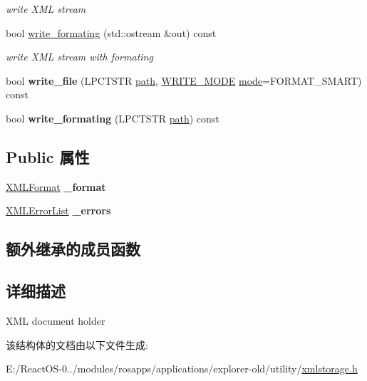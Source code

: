\begin{DoxyCompactItemize}
\begin{DoxyCompactList}\small\item\em write X\+ML stream \end{DoxyCompactList}\item 
\mbox{\label{struct_x_m_l_storage_1_1_x_m_l_doc_aeadd847c0b54fbc43ee477e83d246a5c}} 
bool \hyperlink{struct_x_m_l_storage_1_1_x_m_l_doc_aeadd847c0b54fbc43ee477e83d246a5c}{write\+\_\+formating} (std\+::ostream \&out) const
\begin{DoxyCompactList}\small\item\em write X\+ML stream with formating \end{DoxyCompactList}\item 
\mbox{\label{struct_x_m_l_storage_1_1_x_m_l_doc_a371cebadb2ee0377cf5f3123493a3147}} 
bool {\bfseries write\+\_\+file} (L\+P\+C\+T\+S\+TR \hyperlink{structpath}{path}, \hyperlink{xmlstorage_8h_a384e8ed47866fe059e3ad92b8d89d462}{W\+R\+I\+T\+E\+\_\+\+M\+O\+DE} \hyperlink{interfacevoid}{mode}=F\+O\+R\+M\+A\+T\+\_\+\+S\+M\+A\+RT) const
\item 
\mbox{\label{struct_x_m_l_storage_1_1_x_m_l_doc_ae4fb2de2549f3584ebcbf7a70b1d9fdd}} 
bool {\bfseries write\+\_\+formating} (L\+P\+C\+T\+S\+TR \hyperlink{structpath}{path}) const
\end{DoxyCompactItemize}
\subsection*{Public 属性}
\begin{DoxyCompactItemize}
\item 
\mbox{\label{struct_x_m_l_storage_1_1_x_m_l_doc_a68ea7dc591f7afb6f8c7d99c2392a0b1}} 
\hyperlink{struct_x_m_l_storage_1_1_x_m_l_format}{X\+M\+L\+Format} {\bfseries \+\_\+format}
\item 
\mbox{\label{struct_x_m_l_storage_1_1_x_m_l_doc_abb427a9ea1ee077d244a01cf67fd9132}} 
\hyperlink{struct_x_m_l_storage_1_1_x_m_l_error_list}{X\+M\+L\+Error\+List} {\bfseries \+\_\+errors}
\end{DoxyCompactItemize}
\subsection*{额外继承的成员函数}


\subsection{详细描述}
X\+ML document holder 

该结构体的文档由以下文件生成\+:\begin{DoxyCompactItemize}
\item 
E\+:/\+React\+O\+S-\/0../modules/rosapps/applications/explorer-\/old/utility/\hyperlink{xmlstorage_8h}{xmlstorage.\+h}\end{DoxyCompactItemize}
